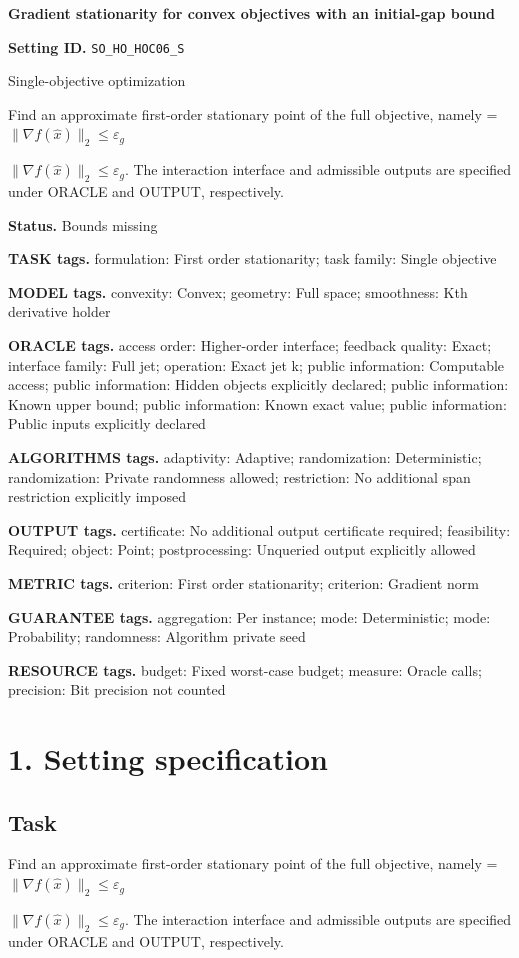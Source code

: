 \documentclass[10pt,a4paper]{article}
\newcommand{\AtlasMath}[1]{\par\begingroup\centering\setbox0=\hbox{$\displaystyle #1$}\ifdim\wd0>1.4\linewidth\typeout{ATLAS WIDE FORMULA: \the\wd0}\fi\ifdim\wd0>\linewidth\resizebox{\linewidth}{!}{\box0}\else\box0\fi\par\endgroup}
\newcommand{\AtlasInlineMath}[1]{\begingroup\setbox0=\hbox{$#1$}\ifdim\wd0>.4\linewidth\endgroup\AtlasMath{#1}\else\endgroup$#1$\fi}
\begin{document}
\raggedright

{\LARGE\bfseries\sffamily\color{AtlasNavy} Gradient stationarity for convex objectives with an initial-gap bound\par}\vspace{5pt}
\textbf{Setting ID.} \texttt{SO\_\allowbreak{}HO\_\allowbreak{}HOC06\_\allowbreak{}S}

Single-objective optimization

Find an approximate first-order stationary point of the full objective, namely \AtlasInlineMath{\|\nabla f(\widehat{x})\|_2\le\varepsilon_g}. The interaction interface and admissible outputs are specified under ORACLE and OUTPUT, respectively.

\textbf{Status.} Bounds missing

\textbf{TASK tags.} formulation: First order stationarity; task family: Single objective

\textbf{MODEL tags.} convexity: Convex; geometry: Full space; smoothness: Kth derivative holder

\textbf{ORACLE tags.} access order: Higher-order interface; feedback quality: Exact; interface family: Full jet; operation: Exact jet k; public information: Computable access; public information: Hidden objects explicitly declared; public information: Known upper bound; public information: Known exact value; public information: Public inputs explicitly declared

\textbf{ALGORITHMS tags.} adaptivity: Adaptive; randomization: Deterministic; randomization: Private randomness allowed; restriction: No additional span restriction explicitly imposed

\textbf{OUTPUT tags.} certificate: No additional output certificate required; feasibility: Required; object: Point; postprocessing: Unqueried output explicitly allowed

\textbf{METRIC tags.} criterion: First order stationarity; criterion: Gradient norm

\textbf{GUARANTEE tags.} aggregation: Per instance; mode: Deterministic; mode: Probability; randomness: Algorithm private seed

\textbf{RESOURCE tags.} budget: Fixed worst-case budget; measure: Oracle calls; precision: Bit precision not counted

\section{1. Setting specification}
\subsection{Task}
Find an approximate first-order stationary point of the full objective, namely \AtlasInlineMath{\|\nabla f(\widehat{x})\|_2\le\varepsilon_g}. The interaction interface and admissible outputs are specified under ORACLE and OUTPUT, respectively.
\end{document}

